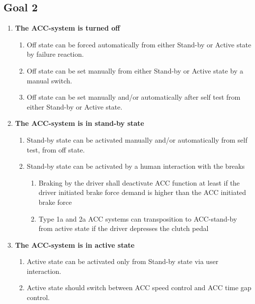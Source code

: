 \vspace{1.5cm}

\subsection{Goal 2}

\begin{enumerate}
    \item {\bf The ACC-system is turned off}
    \begin{enumerate}[label*=\arabic*]
        \item Off state can be forced automatically from either Stand-by or Active state by failure reaction.
        \item Off state can be set manually from either Stand-by or Active state by a manual switch.
        \item Off state can be set manually and/or automatically after self test from either Stand-by or Active state.
    \end{enumerate}

    \item {\bf The ACC-system is in stand-by state}
    \begin{enumerate} [label*=\arabic*]
        \item Stand-by state can be activated manually and/or automatically from self test, from off state.
        \item Stand-by state can be activated by a human interaction with the breaks
        \begin{enumerate}[label*=\arabic*]
            \item Braking by the driver shall deactivate ACC function at least if the driver initiated brake force demand is higher than the ACC initiated brake force
            \item Type 1a and 2a ACC systems can transposition to ACC-stand-by from active state if the driver depresses the clutch pedal
        \end{enumerate}
    \end{enumerate}
    \item {\bf The ACC-system is in active state}
    \begin{enumerate}[label*=\arabic*]
        \item Active state can be activated only from Stand-by state via user interaction.
        \item Active state should switch between ACC speed control and ACC time gap control.
    \end{enumerate}
\end{enumerate}


